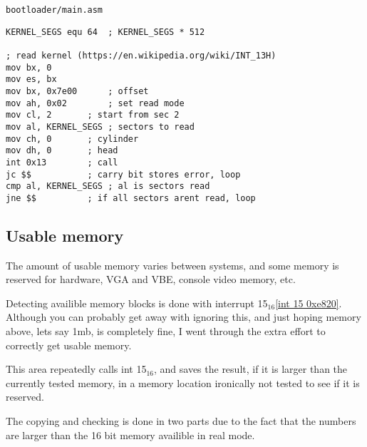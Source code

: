 \documentclass{article}
\begin{document}
\begin{verbatim}
bootloader/main.asm
\end{verbatim}
\begin{verbatim}
KERNEL_SEGS equ 64	; KERNEL_SEGS * 512

; read kernel (https://en.wikipedia.org/wiki/INT_13H)
mov bx, 0
mov es, bx
mov bx, 0x7e00		; offset
mov ah, 0x02		; set read mode
mov cl, 2		; start from sec 2
mov al, KERNEL_SEGS	; sectors to read
mov ch, 0		; cylinder
mov dh, 0		; head
int 0x13		; call
jc $$			; carry bit stores error, loop
cmp al, KERNEL_SEGS	; al is sectors read
jne $$			; if all sectors arent read, loop
\end{verbatim}

\subsection{Usable memory}

The amount of usable memory varies between systems,
and some memory is reserved for hardware, VGA and VBE,
console video memory, etc.

Detecting availible memory blocks is done with interrupt
15$_{16}$\cite{int 15h}\ref{int 15 0xe820}. Although you can probably get
away with ignoring this, and just hoping memory above,
lets say 1mb, is completely fine, I went through the extra
effort to correctly get usable memory.

This area repeatedly calls int 15$_{16}$, and saves the result,
if it is larger than the currently tested memory, in a memory location
ironically not tested to see if it is reserved.

The copying and checking is done in two parts due to the fact
that the numbers are larger than the 16 bit memory availible in real mode.
\end{document}
